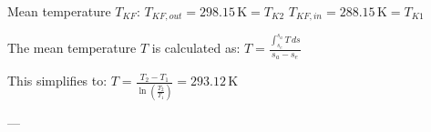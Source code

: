 Mean temperature \( T_{KF} \):  
\( T_{KF,out} = 298.15 \, \text{K} = T_{K2} \)  
\( T_{KF,in} = 288.15 \, \text{K} = T_{K1} \)  

The mean temperature \( T \) is calculated as:  
\( T = \frac{\int_{s_e}^{s_a} T \, ds}{s_a - s_e} \)  

This simplifies to:  
\( T = \frac{T_2 - T_1}{\ln\left(\frac{T_2}{T_1}\right)} = 293.12 \, \text{K} \)  

---